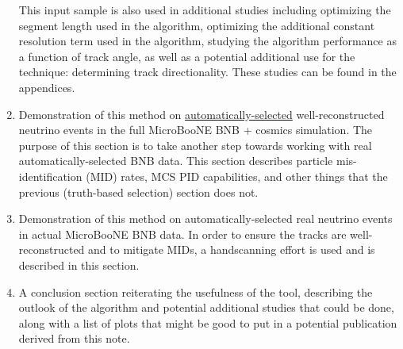 \documentclass{article}
\begin{document}
\begin{enumerate}
This input sample is also used in additional studies including optimizing the segment length used in the algorithm, optimizing the additional constant resolution term used in the algorithm, studying the algorithm performance as a function of track angle, as well as a potential additional use for the technique: determining track directionality. These studies can be found in the appendices.
\item Demonstration of this method on \underline{automatically-selected} well-reconstructed neutrino events in the full MicroBooNE BNB + cosmics simulation. The purpose of this section is to take another step towards working with real automatically-selected BNB data. This section describes particle mis-identification (MID) rates, MCS PID capabilities, and other things that the previous (truth-based selection) section does not.
\item Demonstration of this method on automatically-selected real neutrino events in actual MicroBooNE BNB data. In order to ensure the tracks are well-reconstructed and to mitigate MIDs, a handscanning effort is used and is described in this section.
\item A conclusion section reiterating the usefulness of the tool, describing the outlook of the algorithm and potential additional studies that could be done, along with a list of plots that might be good to put in a potential publication derived from this note.
\end{enumerate}



\clearpage

\clearpage

\clearpage

\clearpage

\clearpage

\clearpage


\clearpage
\begin{appendices}

\end{appendices}

\clearpage

\end{document}
